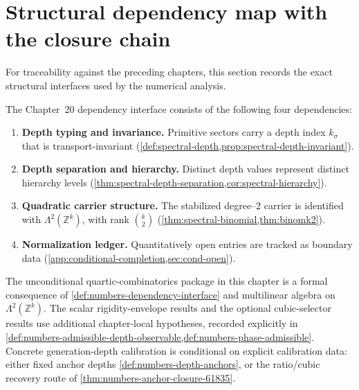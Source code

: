 \section{Structural dependency map with the closure chain}
\label{sec:numbers-dependency-map}

For traceability against the preceding chapters, this section records the
exact structural interfaces used by the numerical analysis.

\begin{definition}
\label{def:numbers-dependency-interface}
The Chapter~20 dependency interface consists of the following four dependencies:
\begin{enumerate}[label=\textup{(\roman*)}]
\item
      \textbf{Depth typing and invariance.}
      Primitive sectors carry a depth index
      \(k_\sigma\) that is transport-invariant
      (\cref{def:spectral-depth,prop:spectral-depth-invariant}).
\item
      \textbf{Depth separation and hierarchy.}
      Distinct depth values represent distinct hierarchy levels
      (\cref{thm:spectral-depth-separation,cor:spectral-hierarchy}).
\item
      \textbf{Quadratic carrier structure.}
      The stabilized degree--\(2\) carrier is identified with
      \(\Lambda^2(\mathbb Z^k)\), with rank \(\binom{k}{2}\)
      (\cref{thm:spectral-binomial,thm:binomk2}).
\item
      \textbf{Normalization ledger.}
      Quantitatively open entries are tracked as boundary data
      (\cref{app:conditional-completion,sec:cond-open}).
\end{enumerate}
\end{definition}

\begin{proposition}
\label{prop:numbers-dependency-role}
The unconditional quartic-combinatorics package in this chapter is a
formal consequence of
\cref{def:numbers-dependency-interface} and multilinear algebra on
\(\Lambda^2(\mathbb Z^k)\).
The scalar rigidity-envelope results and the optional cubic-selector
results use additional chapter-local hypotheses, recorded explicitly in
\cref{def:numbers-admissible-depth-observable,def:numbers-phase-admissible}.
Concrete generation-depth calibration is conditional on explicit calibration
data: either fixed anchor depths
\cref{def:numbers-depth-anchors}, or the ratio/cubic recovery route of
\cref{thm:numbers-anchor-closure-61835}.
\end{proposition}

